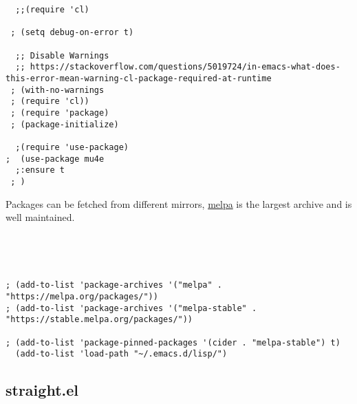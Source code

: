 \documentclass[11pt]{article}
\begin{document}
\begin{verbatim}
  ;;(require 'cl)

 ; (setq debug-on-error t)

  ;; Disable Warnings
  ;; https://stackoverflow.com/questions/5019724/in-emacs-what-does-this-error-mean-warning-cl-package-required-at-runtime
 ; (with-no-warnings
 ; (require 'cl))
 ; (require 'package)
 ; (package-initialize)

  ;(require 'use-package)
;  (use-package mu4e 
  ;:ensure t
 ; )
\end{verbatim}

Packages can be fetched from different mirrors, \href{http://melpa.milkbox.net/\#/}{melpa} is the largest
archive and is well maintained.

\begin{verbatim}




; (add-to-list 'package-archives '("melpa" . "https://melpa.org/packages/"))
; (add-to-list 'package-archives '("melpa-stable" . "https://stable.melpa.org/packages/"))

; (add-to-list 'package-pinned-packages '(cider . "melpa-stable") t)
  (add-to-list 'load-path "~/.emacs.d/lisp/")

\end{verbatim}

\subsection{straight.el}
\label{sec:org3555c4b}
\end{document}
